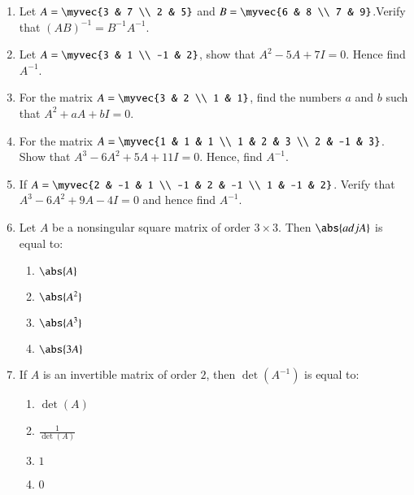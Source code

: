 \documentclass{article}
\theoremstyle{remark}
\begin{document}
\begin{enumerate}[resume]
\item Let $A=\myvec
{3 & 7 \\ 2 & 5}$ and $B=\myvec
{6 & 8 \\ 7 & 9}$.Verify that $(AB)^{-1}=B^{-1} A^{-1}$.
\item Let $A=\myvec
 {3 & 1 \\ -1 & 2}$, show that $A^2-5A+7I=0$. Hence find $A^{-1}$.
\item For the matrix $A=\myvec
{3 & 2 \\ 1 & 1}$, find the numbers $a$ and $b$ such that $A^2+aA+bI=0$.
\item For the matrix $A=\myvec
{1 & 1 & 1 \\ 1 & 2 & 3 \\ 2 & -1 & 3}$. Show that $A^3-6A^2+5A+11I=0$. Hence, find $A^{-1}$.
\item If $A=\myvec
{2 & -1 & 1 \\ -1 & 2 & -1 \\ 1 & -1 & 2}$. Verify that $A^3-6A^2+9A-4I=0$ and hence find $A^{-1}$.
\item Let $A$ be a nonsingular square matrix of order $3\times 3$. Then $\abs{adj A}$ is equal to:
\begin{enumerate}
\item $\abs{A}$
\item $\abs{A^2}$
\item $\abs{A^3}$
\item $\abs{3A}$
\end{enumerate}
\item If $A$ is an invertible matrix of order $2$, then $\det(A^{-1})$ is equal to:
\begin{enumerate}
\item $\det(A)$
\item $\frac{1}{\det(A)}$
\item $1$
\item $0$
\end{enumerate}
\end{enumerate}
\end{document}
